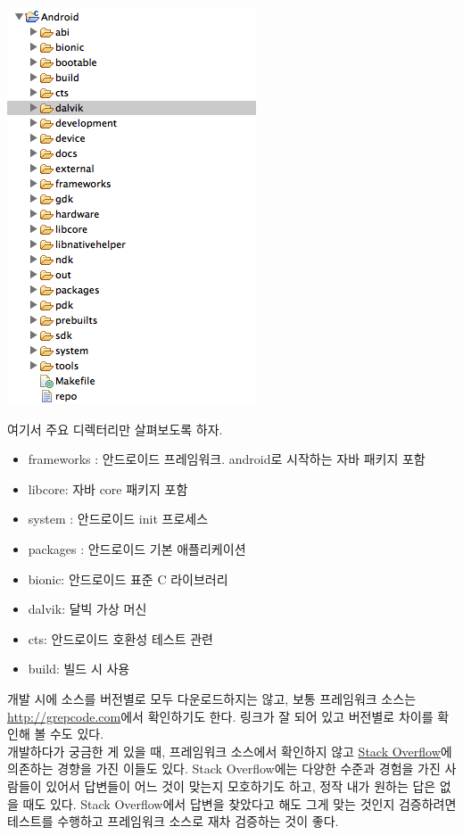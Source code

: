 \includegraphics[scale=0.7]{sourcetree}

여기서 주요 디렉터리만 살펴보도록 하자.
\begin{itemize}
\item frameworks : 안드로이드 프레임워크. android로 시작하는 자바 패키지 포함
\item libcore: 자바 core 패키지 포함
\item system : 안드로이드 init 프로세스
\item packages : 안드로이드 기본 애플리케이션
\item bionic: 안드로이드 표준 C 라이브러리
\item dalvik: 달빅 가상 머신
\item cts: 안드로이드 호환성 테스트 관련
\item build: 빌드 시 사용
\end{itemize}

개발 시에 소스를 버전별로 모두 다운로드하지는 않고, 보통 프레임워크 소스는 
\url{http://grepcode.com}에서 확인하기도 한다. 링크가 잘 되어 있고 버전별로 차이를 확인해 볼 수도 있다.\\

개발하다가 궁금한 게 있을 때, 프레임워크 소스에서 확인하지 않고 \href{http://stackoverlow.com}{Stack Overflow}에 의존하는 경향을 가진 이들도 있다. %
Stack Overflow에는 다양한 수준과 경험을 가진 사람들이 있어서 답변들이 어느 것이 맞는지 모호하기도 하고, 정작 내가 원하는 답은 없을 때도 있다.
Stack Overflow에서 답변을 찾았다고 해도 그게 맞는 것인지 검증하려면 테스트를 수행하고 프레임워크 소스로 재차 검증하는 것이 좋다.\\

